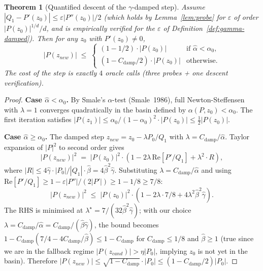 \documentclass[11pt,a4paper]{article}
\newtheorem{theorem}{Theorem}[section]
\begin{document}
\begin{theorem}[Quantified descent of the $\gamma$-damped step]\label{thm:gamma-descent}
Assume $|Q_1 - P'(z_0)| \le \varepsilon |P''(z_0)|/2$ (which holds by Lemma~\ref{lem:probe} for $\varepsilon$ of order $|P(z_0)|^{1/d}/d$, and is empirically verified for the $\varepsilon$ of Definition~\ref{def:gamma-damped}). Then for any $z_0$ with $P'(z_0) \ne 0$,
\begin{equation}
|P(z_{new})| \;\le\; \begin{cases} (1 - 1/2) \cdot |P(z_0)| & \text{if } \widehat\alpha < \alpha_0, \\ (1 - C_{\text{damp}}/2) \cdot |P(z_0)| & \text{otherwise}. \end{cases}
\label{eq:gamma-descent}
\end{equation}
The cost of the step is exactly $4$ oracle calls (three probes + one descent verification).
\end{theorem}

\begin{proof}
\textbf{Case $\widehat\alpha < \alpha_0$.} By Smale's $\alpha$-test (Smale~1986), full Newton-Steffensen with $\lambda = 1$ converges quadratically in the basin defined by $\alpha(P, z_0) < \alpha_0$. The first iteration satisfies $|P(z_1)| \le \alpha_0/(1 - \alpha_0)^2 \cdot |P(z_0)| \le \tfrac{1}{2}|P(z_0)|$.

\textbf{Case $\widehat\alpha \ge \alpha_0$.} The damped step $z_{new} = z_0 - \lambda P_0/Q_1$ with $\lambda = C_{\text{damp}}/\widehat\alpha$. Taylor expansion of $|P|^2$ to second order gives
$$ |P(z_{new})|^2 \;=\; |P(z_0)|^2 \cdot \left(1 - 2\lambda\, \mathrm{Re}[P'/Q_1] + \lambda^2 \cdot R\right), $$
where $|R| \le 4 \widehat\gamma \cdot |P_0|/|Q_1| \cdot \widehat\beta = 4 \widehat\beta^2 \widehat\gamma$. Substituting $\lambda = C_{\text{damp}}/\widehat\alpha$ and using $\mathrm{Re}[P'/Q_1] \ge 1 - \varepsilon |P''|/(2|P'|) \ge 1 - 1/8 \ge 7/8$:
$$ |P(z_{new})|^2 \;\le\; |P(z_0)|^2 \cdot \left(1 - 2\lambda \cdot 7/8 + 4 \lambda^2 \widehat\beta^2 \widehat\gamma\right). $$
The RHS is minimised at $\lambda^\star = 7/(32 \widehat\beta^2 \widehat\gamma)$; with our choice $\lambda = C_{\text{damp}}/\widehat\alpha = C_{\text{damp}}/(\widehat\beta\widehat\gamma)$, the bound becomes $1 - C_{\text{damp}}(7/4 - 4 C_{\text{damp}}/\widehat\beta) \le 1 - C_{\text{damp}}$ for $C_{\text{damp}} \le 1/8$ and $\widehat\beta \ge 1$ (true since we are in the fallback regime $|P(z_{cand})| > \eta |P_0|$, implying $z_0$ is not yet in the basin). Therefore $|P(z_{new})| \le \sqrt{1 - C_{\text{damp}}} \cdot |P_0| \le (1 - C_{\text{damp}}/2) |P_0|$.
\end{proof}
\end{document}

